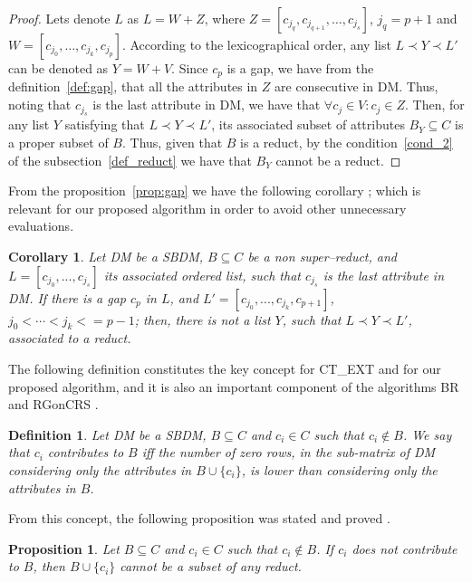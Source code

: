 \documentclass[number,preprint,review,12pt]{elsarticle}
\newtheorem{proposition}{Proposition}
\newtheorem{definition}{Definition}
\newtheorem{proof}{Proof}
\newtheorem{corollary}{Corollary}
\begin{document}
	\begin{proof}
		Lets denote $L$ as $L=W+Z$, where $Z=[c_{j_q},c_{j_{q+1}}, \dots, c_{j_s}]$, $j_q=p+1$ and $W=[c_{j_0}, \dots,c_{j_k}, c_{j_p}]$. According to the lexicographical order, any list $L \prec Y \prec L'$ can be denoted as $Y=W+V$. Since $c_p$ is a gap, we have from the definition~\ref{def:gap}, that all the attributes in $Z$ are consecutive in DM. Thus, noting that $c_{j_s}$ is the last attribute in DM, we have that $\forall c_j \in V: c_j \in Z$. Then, for any list $Y$ satisfying that $L \prec Y \prec L'$, its associated subset of attributes $B_Y \subseteq C$ is a proper subset of $B$. Thus, given that $B$ is a reduct, by the condition~\ref{cond_2} of the subsection~\ref{def_reduct} we have that $B_Y$ cannot be a reduct.
	\end{proof}
	
	From the proposition~\ref{prop:gap} we have the following corollary \citep{Santiesteban03}; which is relevant for our proposed algorithm in order to avoid other unnecessary evaluations.
	
	\begin{corollary}\label{coro:gap} 
		Let DM be a SBDM, $B \subseteq C$ be a non super--reduct, and $L = [c_{j_0},...,c_{j_s}]$ its associated ordered list, such that $c_{j_s}$ is the last attribute in DM. If there is a gap $c_p$ in $L$, and $L' = [c_{j_0},...,c_{j_k},c_{p+1}]$, $j_0<\cdots <j_k<=p-1$; then, there is not a list $Y$, such that $L \prec Y \prec L'$, associated to a reduct.
	\end{corollary}
		
	The following definition constitutes the key concept for CT\_EXT \citep{Sanchez07} and for our proposed algorithm, and it is also an important component of the algorithms BR \citep{Lias09} and RGonCRS \citep{WangP07}.
			
	\begin{definition}\label{def:contrib}
		Let DM be a SBDM, $B \subseteq C$ and  $c_i \in C$ such that $c_i \notin B$. We say that $c_i$ contributes to $B$ iff the	number of zero rows, in the sub-matrix of DM considering only the attributes in $B\cup\{c_i\}$, is lower than considering only the attributes in $B$.
	\end{definition}
			
	From this concept, the following proposition was stated and proved \cite{Sanchez07}.
			
	\begin{proposition}\label{prop:contrib} 
		Let $B \subseteq C$ and  $c_i \in C$ such that $c_i \notin B$. If $c_i$ does not contribute to $B$, then $B\cup\{c_i\}$ cannot be a subset of any reduct.
	\end{proposition}
	
\end{document}
